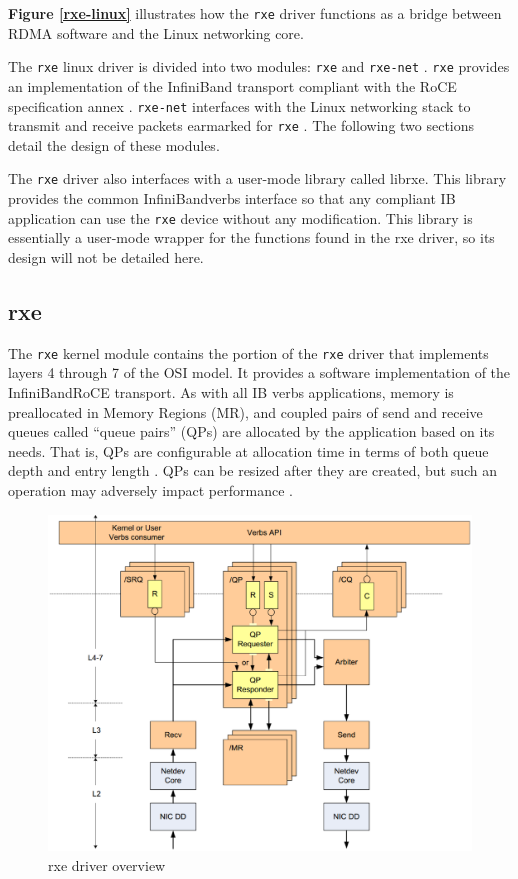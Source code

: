 \documentclass[11pt]{book}
\begin{document}
\textbf{Figure \ref{rxe-linux}} illustrates how the \verb;rxe; driver functions
as a bridge between RDMA software and the Linux networking core.

The \verb;rxe; linux driver is divided into two modules: \verb;rxe; and
\verb;rxe-net; \cite{pearson-10}. \verb;rxe; provides an implementation of the
InfiniBand transport compliant with the RoCE specification annex
\cite{InfiniBandTARoCE-10}. \verb;rxe-net; interfaces with the Linux networking
stack to transmit and receive packets earmarked for \verb;rxe;
\cite{pearson-10}. The following two sections detail the design of these
modules.

The \verb;rxe; driver also interfaces with a user-mode library called
librxe. This library provides the common InfiniBand\texttrademark verbs
interface so that any compliant IB application can use the \verb;rxe; device
without any modification. This library is essentially a user-mode wrapper for
the functions found in the rxe driver, so its design will not be detailed here.

\subsection{\textbf{rxe}}
\label{rxe}

The \verb;rxe; kernel module contains the portion of the \verb;rxe; driver that
implements layers 4 through 7 of the OSI model. It provides a software
implementation of the InfiniBand\texttrademark RoCE transport. As with all IB
verbs applications, memory is preallocated in Memory Regions (MR), and coupled
pairs of send and receive queues called ``queue pairs'' (QPs) are allocated by
the application based on its needs. That is, QPs are configurable at allocation
time in terms of both queue depth and entry length
\cite{InfiniBandTARoCE-10}\cite{InfiniBandTABase-07}. QPs can be resized after
they are created, but such an operation may adversely impact performance
\cite{InfiniBandTARoCE-10}.

\begin{figure}[h]
\includegraphics[width=\textwidth]{rxe_overview}
\caption{rxe driver overview \protect\cite{pearson-10}}
\label{rxe-overview}
\end{figure}
\end{document}
